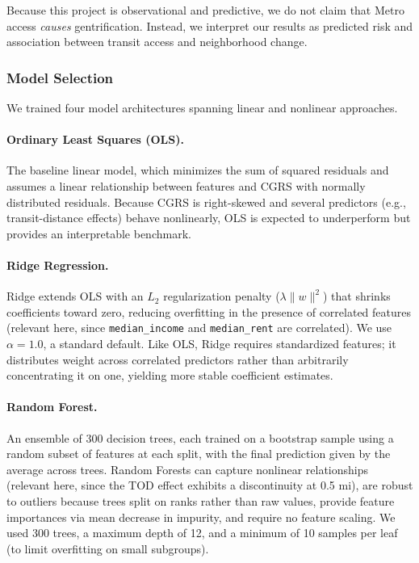 \documentclass[11pt]{article}
\begin{document}
Because this project is observational and predictive, we do not claim that Metro access \emph{causes} gentrification. Instead, we interpret our results as predicted risk and association between transit access and neighborhood change.

\subsubsection{Model Selection}

We trained four model architectures spanning linear and nonlinear approaches.

\paragraph{Ordinary Least Squares (OLS).} The baseline linear model, which minimizes the sum of squared residuals and assumes a linear relationship between features and CGRS with normally distributed residuals. Because CGRS is right-skewed and several predictors (e.g., transit-distance effects) behave nonlinearly, OLS is expected to underperform but provides an interpretable benchmark.

\paragraph{Ridge Regression.} Ridge extends OLS with an $L_2$ regularization penalty ($\lambda \lVert w \rVert^2$) that shrinks coefficients toward zero, reducing overfitting in the presence of correlated features (relevant here, since \texttt{median\_income} and \texttt{median\_rent} are correlated). We use $\alpha = 1.0$, a standard default. Like OLS, Ridge requires standardized features; it distributes weight across correlated predictors rather than arbitrarily concentrating it on one, yielding more stable coefficient estimates.

\paragraph{Random Forest.} An ensemble of 300 decision trees, each trained on a bootstrap sample using a random subset of features at each split, with the final prediction given by the average across trees. Random Forests can capture nonlinear relationships (relevant here, since the TOD effect exhibits a discontinuity at 0.5 mi), are robust to outliers because trees split on ranks rather than raw values, provide feature importances via mean decrease in impurity, and require no feature scaling. We used 300 trees, a maximum depth of 12, and a minimum of 10 samples per leaf (to limit overfitting on small subgroups).
\end{document}
